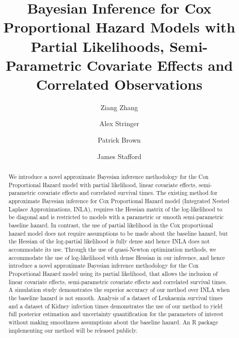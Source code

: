 \documentclass[num-refs,serif,10pt]{wiley-article}
\title{Bayesian Inference for Cox Proportional Hazard Models with Partial Likelihoods, Semi-Parametric Covariate Effects and Correlated Observations}
\author[1]{Ziang Zhang}
\author[1,2]{Alex Stringer}
\author[1,2]{Patrick Brown}
\author[1]{James Stafford}
\affil[1]{Department of Statistical Sciences, University of Toronto, Ontario,Canada}
\affil[2]{Centre for Global Health Research, St. Michael's Hospital, Ontario,Canada}
\begin{document}
\begin{frontmatter}
\maketitle

\begin{abstract}
{\selectfont
We introduce a novel approximate Bayesian inference methodology for the Cox Proportional Hazard model with partial likelihood, linear covariate effects, semi-parametric covariate effects and correlated survival times. The existing method for approximate Bayesian inference for Cox Proportional Hazard model (Integrated Nested Laplace Approximations, INLA), requires the Hessian matrix of the log-likelihood to be diagonal and is restricted to models with a parametric or smooth semi-parametric baseline hazard. In contrast, the use of partial likelihood in the Cox proportional hazard model does not require assumptions to be made about the baseline hazard, but the Hessian of the log-partial likelihood is fully dense and hence INLA does not accommodate its use. Through the use of quasi-Newton optimization methods, we accommodate the use of log-likelihood with dense Hessian in our inference, and hence introduce a novel approximate Bayesian inference methodology for the Cox Proportional Hazard model using its partial likelihood, that allows the inclusion of linear covariate effects, semi-parametric covariate effects and correlated survival times. A simulation study demonstrates the superior accuracy of our method over INLA when the baseline hazard is not smooth. Analysis of a dataset of Leukaemia survival times and a dataset of Kidney infection times demonstrates the use of our method to yield full posterior estimation and uncertainty quantification for the parameters of interest without making smoothness assumptions about the baseline hazard. An R package implementing our method will be released publicly.
}

\end{abstract}
\end{frontmatter}
\end{document}

